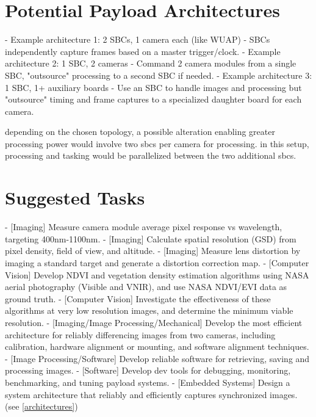 \documentclass[conference]{IEEEtran} %
\begin{document}
\section{Potential Payload Architectures}
\label{architectures}
    - Example architecture 1: 2 SBCs, 1 camera each (like WUAP) - SBCs independently capture frames based on a master trigger/clock.
    - Example architecture 2: 1 SBC, 2 cameras - Command 2 camera modules from a single SBC, "outsource" processing to a second SBC if needed.
    - Example architecture 3: 1 SBC, 1+ auxiliary boards - Use an SBC to handle images and processing but "outsource" timing and frame captures to a specialized daughter board for each camera.

depending on the chosen topology, a possible alteration enabling greater processing power would involve two sbcs per camera for processing. in this setup, processing and tasking would be parallelized between the two additional sbcs.

\section{Suggested Tasks}

- [Imaging] Measure camera module average pixel response vs wavelength, targeting 400nm-1100nm.
- [Imaging] Calculate spatial resolution (GSD) from pixel density, field of view, and altitude.
- [Imaging] Measure lens distortion by imaging a standard target and generate a distortion correction map.
- [Computer Vision] Develop NDVI and vegetation density estimation algorithms using NASA aerial photography (Visible and VNIR), and use NASA NDVI/EVI data as ground truth.
- [Computer Vision] Investigate the effectiveness of these algorithms at very low resolution images, and determine the minimum viable resolution.
- [Imaging/Image Processing/Mechanical] Develop the most efficient architecture for reliably differencing images from two cameras, including calibration, hardware alignment or mounting, and software alignment techniques.
- [Image Processing/Software] Develop reliable software for retrieving, saving and processing images.
- [Software] Develop dev tools for debugging, monitoring, benchmarking, and tuning payload systems.
- [Embedded Systems] Design a system architecture that reliably and efficiently captures synchronized images. (see \autoref{architectures})
\end{document}
